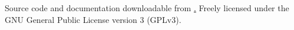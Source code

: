 Source code and documentation downloadable from
\href{http://infernal.janelia.org}. Freely licensed under the GNU
General Public License version 3 (GPLv3).
